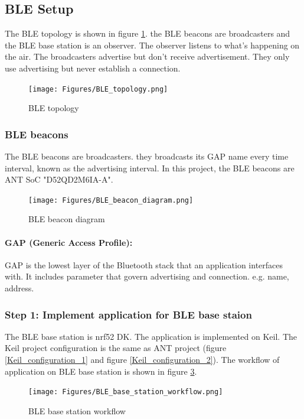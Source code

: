 \documentclass{article}
\begin{document}
\subsection{BLE Setup}
The BLE topology is shown in figure \ref{BLE_topology}. the BLE beacons are broadcasters and the BLE base station is an observer. The observer listens to what's happening on the air. The broadcasters advertise but don't receive advertisement. They only use advertising but never establish a connection.
\begin{figure}
\begin{center}
\caption{BLE topology}
\label{BLE_topology}
\texttt{[image: Figures/BLE\_topology.png]}
\end{center}
\end{figure}

\subsubsection{BLE beacons}
The BLE beacons are broadcasters. they broadcasts its GAP name every time interval, known as the advertising interval. In this project, the BLE beacons are ANT SoC "D52QD2M6IA-A".

\begin{figure}
\begin{center}
\caption{BLE beacon diagram}
\label{BLE_beacon_diagram}
\texttt{[image: Figures/BLE\_beacon\_diagram.png]}
\end{center}
\end{figure}

\paragraph{GAP (Generic Access Profile): }
GAP is the lowest layer of the Bluetooth stack that an application interfaces with. It includes parameter that govern advertising and connection. e.g. name, address.

\subsubsection{Step 1: Implement application for BLE base staion}
The BLE base station is nrf52 DK. The application is implemented on Keil. The Keil project configuration is the same as ANT project (figure \ref{Keil_configuration_1} and figure \ref{Keil_configuration_2}). The workflow of application on BLE base station is shown in figure \ref{BLE_base_station_workflow}.

\begin{figure}
\begin{center}
\caption{BLE base station workflow}
\label{BLE_base_station_workflow}
\texttt{[image: Figures/BLE\_base\_station\_workflow.png]}
\end{center}
\end{figure}
\end{document}
